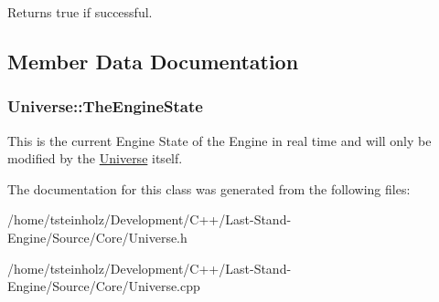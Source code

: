 \begin{DoxyReturn}{Returns}
true if successful. 
\end{DoxyReturn}


\subsection{Member Data Documentation}
\hypertarget{classUniverse_a8da2dd7a1c2bb9b7e0447e06ef61df5c}{}
\subsubsection[{The\+Engine\+State}]{ Universe\+::\+The\+Engine\+State}\label{classUniverse_a8da2dd7a1c2bb9b7e0447e06ef61df5c}
This is the current Engine State of the Engine in real time and will only be modified by the \hyperlink{classUniverse}{Universe} itself. 

The documentation for this class was generated from the following files\+:\begin{DoxyCompactItemize}
\item 
/home/tsteinholz/\+Development/\+C++/\+Last-\/\+Stand-\/\+Engine/\+Source/\+Core/Universe.\+h\item 
/home/tsteinholz/\+Development/\+C++/\+Last-\/\+Stand-\/\+Engine/\+Source/\+Core/Universe.\+cpp\end{DoxyCompactItemize}
